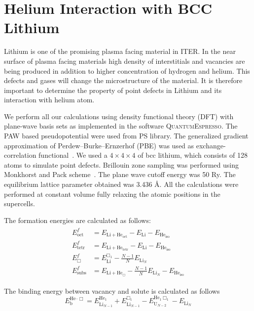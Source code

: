 \chapter{Helium Interaction with BCC Lithium}
Lithium is one of the promising plasma facing material in ITER. In the near surface of plasma facing materials high density of interstitials and vacancies are being produced in addition to higher concentration of hydrogen and helium. This defects and gases will change the microstructure of the material. It is therefore important to determine the property of point defects in Lithium and its interaction with helium atom.

We perform all our calculations using density functional theory (DFT) with plane-wave basis sets as implemented in the software \textsc{QuantumEspresso}\cite{}. The PAW based pseudopotential were used from PS library. The generalized gradient approximation of Perdew--Burke--Ernzerhof (PBE) was used as exchange-correlation functional~\cite{}. We used a $4\times4\times4$ of bcc lithium, which consists of 128 atoms to simulate point defects. Brillouin zone sampling was performed using Monkhorst and Pack scheme~\cite{}. The plane wave cutoff energy was 50 Ry. The equilibrium lattice parameter obtained was 3.436 \AA. All the calculations were performed at constant volume fully relaxing the atomic positions in the supercells.

The formation energies are calculated as follows:
\begin{align}\label{eq_forme}
\begin{split}
 E^{f}_{\text{oct}} & = E_{\text{Li}+\text{He}_{\text{oct}}} - E_{\text{Li}} - E_{\text{He}_{\text{iso}}} \\
 E^{f}_{\text{tetr}}& = E_{\text{Li}+\text{He}_{\text{tetr}}} - E_{\text{Li}} - E_{\text{He}_{\text{iso}}} \\
 E^f_{\Box} & = E^{{\Box}_1}_{\text{Li}} - \frac{N-1}{N} E_{\text{Li}_N} \\
 E^f_{\text{subs}} & = E_{\text{Li}+\text{He}_{\Box}} - \frac{N-1}{N} E_{\text{Li}_N} - E_{\text{He}_{\text{iso}}}
\end{split}
 \end{align}

The binding energy between vacancy and solute is calculated as follows
\begin{equation}\label{eq_binde}
 E_\text{b}^{\mathrm{He}\text{--}\Box} = E^{\mathrm{He}_1}_{\mathrm{Li}_{N-1}} + E^{\Box_1}_{\mathrm{Li}_{N-1}}- E^{\mathrm{He}_1\Box_1}_{\mathrm{U}_{N-2}} - E_{\mathrm{Li}_N}
\end{equation}

